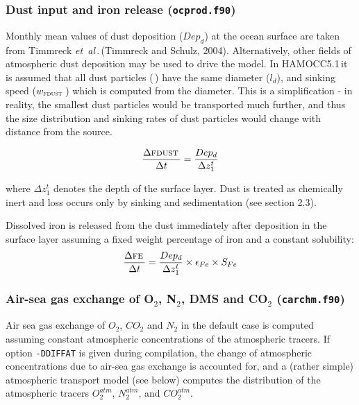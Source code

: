 \documentclass[11pt,a4paper,fleqn,twoside]{article}
\def\fe{\text{\textsc{fe}}\,}
\def\fdust{\text{\textsc{fdust}}\,}
\newcommand{\etal}{{\em et~al\,}.\,}
\newcommand{\ham}{HAMOCC5.1\,}
\begin{document}
\subsubsection{\label{dust_input}Dust input and iron release ({\tt ocprod.f90})}

Monthly mean values of dust deposition ($Dep_d$) at the ocean surface are taken
from Timmreck \etal (Timmreck and Schulz, 2004)\nocite{timmreck:2004}. Alternatively,
other fields of atmospheric dust deposition may be used to drive the model. 
In \ham it is assumed that all dust particles (\fdust) have the same diameter ($l_d$), and sinking
speed ($w_\fdust$) which is computed from the diameter. This is a
simplification - in reality, the smallest dust particles would be transported much
further, and thus the size distribution and sinking rates of 
dust particles would change with distance from the source.

\begin{equation}
\frac{\Delta  \fdust}{\Delta  t} = \frac{Dep_d}{\Delta z_1^t}
\end{equation}

where $\Delta z_1^t$ denotes the depth of the surface layer. Dust is 
treated as chemically inert and loss occurs only by sinking and sedimentation
(see section 2.3).

Dissolved iron is released from the dust immediately after deposition in 
the surface layer assuming a fixed weight percentage of iron and a constant
solubility:
\begin{equation}
\frac{\Delta  \fe}{\Delta  t} = \frac{Dep_d}{\Delta z_1^t}\times \epsilon_{Fe}\times S_{Fe}
\end{equation}

\subsubsection{\label{air_sea_gas_exchange}Air-sea gas exchange of O$_2$,
N$_2$, DMS and CO$_2$  ({\tt carchm.f90})}

Air sea gas exchange of $O_2$, $CO_2$ and $N_2$ in the default case is computed
assuming constant atmospheric concentrations of the atmospheric tracers. If
option {\tt -DDIFFAT} is given during compilation,  the change of atmospheric
concentrations due to air-sea gas exchange is accounted for, and a (rather simple) 
atmospheric transport model (see below) computes the distribution of the atmospheric tracers
$O^{atm}_2$, $N^{atm}_2$, and $CO^{atm}_2$.  
\end{document}
